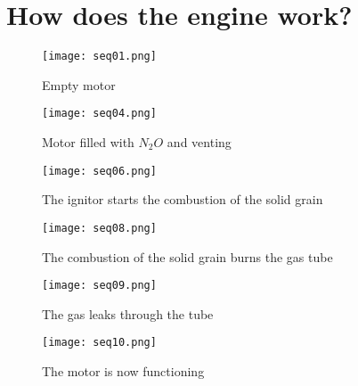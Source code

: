 
\section*{How does the engine work?}

\begin{figure}[H]
  \centering
  \texttt{[image: seq01.png]}
  \caption{Empty motor}
  \label{fig:emptyMotor}
\end{figure}

\begin{figure}[H]
  \centering
  \texttt{[image: seq04.png]}
  \caption{Motor filled with $N_2O$ and venting}
  \label{fig:filledMotor}
\end{figure}

\begin{figure}[H]
  \centering
  \texttt{[image: seq06.png]}
  \caption{The ignitor starts the combustion of the solid grain}
  \label{fig:startSolidBurnMotor}
\end{figure}

\begin{figure}[H]
  \centering
  \texttt{[image: seq08.png]}
  \caption{The combustion of the solid grain burns the gas tube}
  \label{fig:solidBurningMotor}
\end{figure}

\begin{figure}[H]
  \centering
  \texttt{[image: seq09.png]}
  \caption{The gas leaks through the tube}
  \label{fig:gasLeakingMotor}
\end{figure}

\begin{figure}[H]
  \centering
  \texttt{[image: seq10.png]}
  \caption{The motor is now functioning}
  \label{fig:functioningMotor}
\end{figure}
